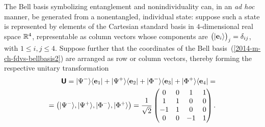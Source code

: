 \documentclass[%
  twocolumn,
 showpacs,
 showkeys,
 preprintnumbers,
 amsmath,amssymb,
 aps,
  pra,
  longbibliography,
 floatfix,
 ]{revtex4-1}
\begin{document}
The Bell basis symbolizing entanglement and nonindividuality can, in an {\it ad hoc} manner, be generated from a nonentangled, individual state:
suppose such a state is represented by elements of the Cartesian standard basis
in $4$-dimensional real space ${\Bbb R}^4$, representable as column vectors whose components are
$\begin{pmatrix} \vert {\bf e}_i \rangle \end{pmatrix}_j = \delta_{ij}$, with $1\le i,j \le 4$.
Suppose further that the coordinates
of the Bell basis~(\ref{2014-m-ch-fdvs-bellbasis2}) are arranged as row or column vectors, thereby forming the respective unitary transformation
\begin{equation}
\begin{split}
\textsf{\textbf{U}} =
\vert \Psi^- \rangle \langle {\bf e}_1  \vert  +
\vert \Psi^+ \rangle \langle {\bf e}_2  \vert  +
\vert \Phi^- \rangle \langle {\bf e}_3  \vert  +
\vert \Phi^+ \rangle \langle {\bf e}_4  \vert
=
\\
=
\begin{pmatrix}
\vert \Psi^- \rangle ,
\vert \Psi^+ \rangle ,
\vert \Phi^- \rangle ,
\vert \Phi^+ \rangle  \end{pmatrix}
=   \frac{1}{\sqrt{2}}
\begin{pmatrix}
0 & 0 &   1 &   1 \\
1 & 1 &   0 &   0 \\
-1& 1 &   0 &   0 \\
0 & 0 &  -1 &   1
 \end{pmatrix}
.
\end{split}
\label{2014-m-ch-fdvs-bellbasis2m}
\end{equation}
\end{document}
